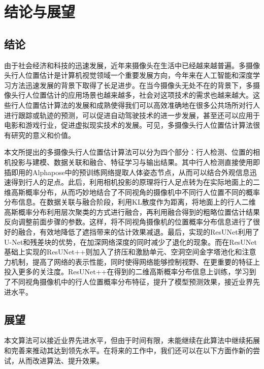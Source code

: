 
\chapter{结论与展望}

\section{结论}

由于社会经济和科技的迅速发展，近年来摄像头在生活中已经越来越普遍。多摄像头行人位置估计是计算机视觉领域一个重要发展方向，今年来在人工智能和深度学习方法迅速发展的背景下取得了长足进步。在当今摄像头无处不在的背景下，多摄像头行人位置估计的应用场景也越来越多，社会对这项技术的需求也越来越大。这些行人位置估计算法的发展和成熟使得我们可以高效准确地在很多公共场所对行人进行跟踪或轨迹的预测，可以促进自动驾驶技术的进一步发展，甚至还可以应用于电影和游戏行业，促进虚拟现实技术的发展。可见，多摄像头行人位置估计算法很有研究的意义和价值。

本文所提出的多摄像头行人位置估计算法可以分为四个部分：行人检测、位置的相机投影与建模、数据关联和融合、特征学习与输出结果。其中行人检测直接使用即插即用的Alphapose中的预训练网络提取人体姿态节点，从而可以结合外观信息迅速得到行人的足点。此后，利用相机投影的原理将行人足点转为在实际地面上的二维高斯概率分布，从而巧妙地结合了不同视角的摄像机中不同行人位置不同的概率分布信息。在数据关联与融合阶段，利用KL散度作为距离，将地面上的行人二维高斯概率分布利用层次聚类的方式进行融合，再利用融合得到的粗略位置估计结果反向调整前面步骤的参数。这样，将不同视角摄像机的位置概率分布信息进行了很好的融合，有效地降低了遮挡带来的估计效果减退。最后，实现的ResUNet利用了U-Net和残差块的优势，在加深网络深度的同时减少了退化的现象。而在ResUNet基础上实现的ResUNet++则加入了挤压和激励单元、空洞空间金字塔池化和注意力机制，提高了网络的表示性能，同时使得网络能够控制视野、在更重要的特征上投入更多的关注度。ResUNet++在得到的二维高斯概率分布信息上训练，学习到了不同视角摄像机中的行人位置概率分布特征，提升了模型预测效果，接近业界先进水平。

\section{展望}

本文算法可以接近业界先进水平，但由于时间有限，未能继续在此算法中继续拓展和完善来推动其达到领先水平。在将来的工作中，我们还可以在以下方面作新的尝试，从而改进算法、提升效果。

